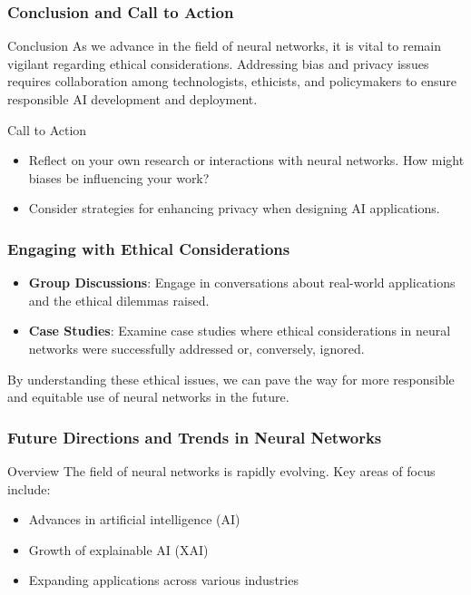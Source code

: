 \documentclass[aspectratio=169]{beamer}
\begin{document}
\begin{frame}[fragile]
    \frametitle{Conclusion and Call to Action}
    \begin{block}{Conclusion}
        As we advance in the field of neural networks, it is vital to remain vigilant regarding ethical considerations. Addressing bias and privacy issues requires collaboration among technologists, ethicists, and policymakers to ensure responsible AI development and deployment.
    \end{block}
    
    \begin{block}{Call to Action}
        \begin{itemize}
            \item Reflect on your own research or interactions with neural networks. How might biases be influencing your work?
            \item Consider strategies for enhancing privacy when designing AI applications.
        \end{itemize}
    \end{block}
\end{frame}

\begin{frame}[fragile]
    \frametitle{Engaging with Ethical Considerations}
    \begin{itemize}
        \item \textbf{Group Discussions}: Engage in conversations about real-world applications and the ethical dilemmas raised.
        \item \textbf{Case Studies}: Examine case studies where ethical considerations in neural networks were successfully addressed or, conversely, ignored.
    \end{itemize}
    
    By understanding these ethical issues, we can pave the way for more responsible and equitable use of neural networks in the future.
\end{frame}

\begin{frame}[fragile]
    \frametitle{Future Directions and Trends in Neural Networks}
    \begin{block}{Overview}
        The field of neural networks is rapidly evolving. Key areas of focus include:
        \begin{itemize}
            \item Advances in artificial intelligence (AI)
            \item Growth of explainable AI (XAI)
            \item Expanding applications across various industries
        \end{itemize}
    \end{block}
\end{frame}
\end{document}
